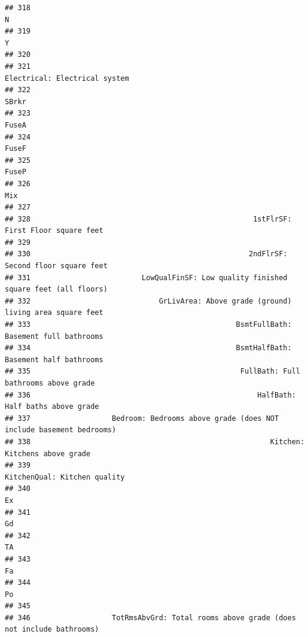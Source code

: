 \documentclass[
]{article}
\begin{document}
\begin{verbatim}
## 318                                                                                    N
## 319                                                                                    Y
## 320                                                                                     
## 321                                                        Electrical: Electrical system
## 322                                                                                SBrkr
## 323                                                                                FuseA
## 324                                                                                FuseF
## 325                                                                                FuseP
## 326                                                                                  Mix
## 327                                                                                     
## 328                                                    1stFlrSF: First Floor square feet
## 329                                                                                     
## 330                                                   2ndFlrSF: Second floor square feet
## 331                          LowQualFinSF: Low quality finished square feet (all floors)
## 332                              GrLivArea: Above grade (ground) living area square feet
## 333                                                BsmtFullBath: Basement full bathrooms
## 334                                                BsmtHalfBath: Basement half bathrooms
## 335                                                 FullBath: Full bathrooms above grade
## 336                                                     HalfBath: Half baths above grade
## 337                   Bedroom: Bedrooms above grade (does NOT include basement bedrooms)
## 338                                                        Kitchen: Kitchens above grade
## 339                                                         KitchenQual: Kitchen quality
## 340                                                                                   Ex
## 341                                                                                   Gd
## 342                                                                                   TA
## 343                                                                                   Fa
## 344                                                                                   Po
## 345                                                                                     
## 346                   TotRmsAbvGrd: Total rooms above grade (does not include bathrooms)

\end{verbatim}
\end{document}
